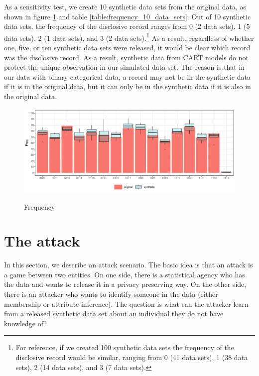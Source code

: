 \documentclass[runningheads]{llncs}
\begin{document}
As a sensitivity test, we create 10 synthetic data sets from the original data, as shown in figure \ref{fig:cart_histogram_compare_10} and table \ref{table:frequency_10_data_sets}.  Out of 10 synthetic data sets, the frequency of the disclosive record ranges from 0 (2 data sets), 1 (5 data sets), 2 (1 data sets), and 3 (2 data sets).\footnote{For reference, if we created 100 synthetic data sets the frequency of the disclosive record would be similar, ranging from 0 (41 data sets), 1 (38 data sets), 2 (14 data sets), and 3 (7 data sets).}  As a result, regardless of whether one, five, or ten synthetic data sets were released, it would be clear which record was the disclosive record.  As a result, synthetic data from CART models do not protect the unique observation in our simulated data set.  The reason is that in our data with binary categorical data, a record may not be in the synthetic data if it is in the original data, but it can only be in the synthetic data if it is also in the original data.  

\begin{figure}[!h]
    \centering
    \caption{Frequency}
    \includegraphics[width=\textwidth]{../graphs/graph_cart_histogram_compare_10.pdf}
    \label{fig:cart_histogram_compare_10}
\end{figure}

\section{The attack}

In this section, we describe an attack scenario.  The basic idea is that an attack is a game between two entities.  On one side, there is a statistical agency who has the data and wants to release it in a privacy preserving way.  On the other side, there is an attacker who wants to identify someone in the data (either membership or attribute inference). The question is what can the attacker learn from a released synthetic data set about an individual they do not have knowledge of?
\end{document}
